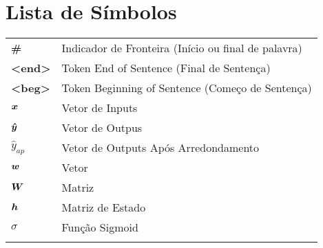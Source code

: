 \chapter{Lista de Símbolos}
\begin{tabular}{ll}
\vspace{2mm}
\textbf{\#}   &Indicador de Fronteira (Início ou final de palavra)\\ \vspace{2mm}
\textbf{<end>}   &Token End of Sentence (Final de Sentença)\\ \vspace{2mm}
\textbf{<beg>}   &Token Beginning of Sentence (Começo de Sentença)\\ \vspace{2mm}
$\bm{x}$    &Vetor de Inputs\\ \vspace{2mm}
$\bm{\hat{y}}$    &Vetor de Outpus\\ \vspace{2mm}
$\hat{y}_{ap}$  &Vetor de Outputs Após Arredondamento \\ \vspace{2mm}
$\bm{w}$    &Vetor\\ \vspace{2mm}
$\bm{W}$    &Matriz\\ \vspace{2mm}
$\bm{h}$    &Matriz de Estado\\ \vspace{2mm}
$\sigma$ & Função Sigmoid \\ \vspace{2mm}
\end{tabular}
